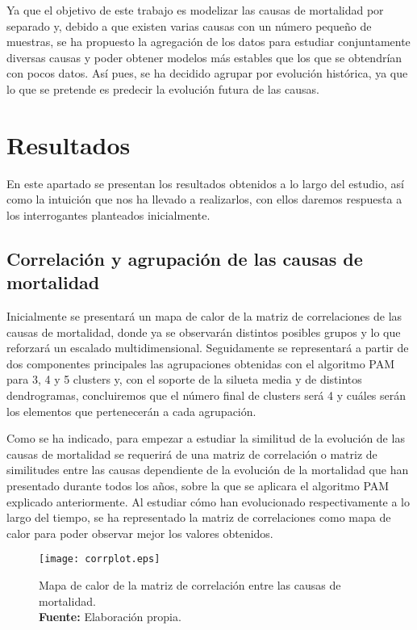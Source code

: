 \documentclass{article}
\begin{document}
Ya que el objetivo de este trabajo es modelizar las causas de mortalidad por separado y, debido a que existen varias causas con un número pequeño de muestras, se ha propuesto la agregación de los datos para estudiar conjuntamente diversas causas y poder obtener modelos más estables que los que se obtendrían con pocos datos. Así pues, se ha decidido agrupar por evolución histórica, ya que lo que se pretende es predecir la evolución futura de las causas.

\newpage
\section{Resultados}

En este apartado se presentan los resultados obtenidos a lo largo del estudio, así como la intuición que nos ha llevado a realizarlos, con ellos daremos respuesta a los interrogantes planteados inicialmente. 
\subsection{Correlación y agrupación de las causas de mortalidad}

Inicialmente se presentará un mapa de calor de la matriz de correlaciones de las causas de mortalidad, donde ya se observarán distintos posibles grupos y lo que reforzará un escalado multidimensional. Seguidamente se representará a partir de dos componentes principales las agrupaciones obtenidas con el algoritmo PAM para 3, 4 y 5 clusters y, con el soporte de la silueta media y de distintos dendrogramas, concluiremos que el número final de clusters será 4 y cuáles serán los elementos que pertenecerán a cada agrupación.

Como se ha indicado, para empezar a estudiar la similitud de la evolución de las causas de mortalidad se requerirá de una matriz de correlación o matriz de similitudes entre las causas dependiente de la evolución de la mortalidad que han presentado durante todos los años, sobre la que se aplicara el algoritmo PAM explicado anteriormente. Al estudiar cómo han evolucionado respectivamente a lo largo del tiempo, se ha representado la matriz de correlaciones como mapa de calor para poder observar mejor los valores obtenidos.

\begin{figure}[H]
\centering
\texttt{[image: corrplot.eps]}
\caption{\centering Mapa de calor de la matriz de correlación entre las causas de mortalidad. \\ \textbf{Fuente:} Elaboración propia.}
\label{mapacalor}
\end{figure}
\end{document}
